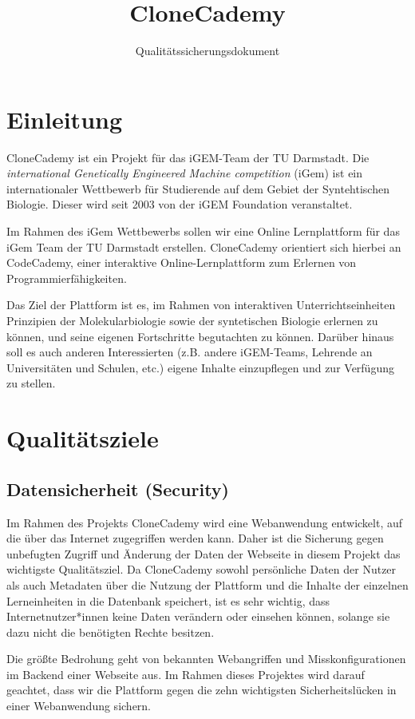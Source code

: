 \documentclass[accentcolor=tud0b,12pt,paper=a4]{tudreport}
\title{CloneCademy}
\subtitle{Qualitätssicherungsdokument}
\begin{document}
\maketitle
\tableofcontents

\chapter{Einleitung}
CloneCademy ist ein Projekt für das iGEM-Team der TU Darmstadt. Die \emph{international Genetically Engineered Machine competition} (iGem) ist ein internationaler Wettbewerb für Studierende auf dem Gebiet der Syntehtischen Biologie.
Dieser wird seit 2003 von der iGEM Foundation veranstaltet. 

Im Rahmen des iGem Wettbewerbs sollen wir eine Online Lernplattform für das iGem Team der TU Darmstadt erstellen. CloneCademy orientiert sich hierbei an CodeCademy, einer interaktive Online-Lernplattform zum Erlernen von Programmierfähigkeiten.

Das Ziel der Plattform ist es, im Rahmen von interaktiven Unterrichtseinheiten Prinzipien der Molekularbiologie sowie der syntetischen Biologie erlernen zu können, und seine eigenen Fortschritte begutachten zu können. Darüber hinaus soll es auch anderen Interessierten (z.B. andere iGEM-Teams, Lehrende an Universitäten und Schulen, etc.) eigene Inhalte einzupflegen und zur Verfügung zu stellen.

\chapter{Qualitätsziele}
\section{Datensicherheit (Security)}

Im Rahmen des Projekts CloneCademy wird eine Webanwendung entwickelt, auf die über das Internet zugegriffen werden kann. Daher ist die Sicherung gegen unbefugten Zugriff und Änderung der Daten der Webseite in diesem Projekt das wichtigste Qualitätsziel. Da CloneCademy sowohl persönliche Daten der Nutzer als auch Metadaten über die Nutzung der Plattform und die Inhalte der einzelnen Lerneinheiten in die Datenbank speichert, ist es sehr wichtig, dass Internetnutzer*innen keine Daten verändern oder einsehen können, solange sie dazu nicht die benötigten Rechte besitzen.
		
Die größte Bedrohung geht von bekannten Webangriffen und Misskonfigurationen im Backend einer Webseite aus. Im Rahmen dieses Projektes wird darauf geachtet, dass wir die Plattform gegen die zehn wichtigsten Sicherheitslücken in einer Webanwendung sichern.
\end{document}
